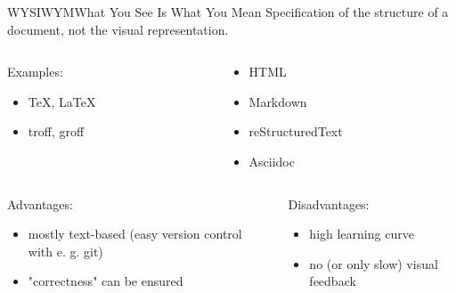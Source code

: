 \documentclass{setbeamer}
\begin{document}
\begin{frame}{WYSIWYM}{What You See Is What You Mean}
    Specification of the structure of a document, not the visual representation.

    \begin{columns}
        \begin{column}{0.5\textwidth}
            Examples:
            \begin{itemize}
                \item \TeX{}, \LaTeX{}
                \item troff, groff
            \end{itemize}
        \end{column}

        \begin{column}{0.5\textwidth}
            \begin{itemize}
                \item HTML
                \item Markdown
                \item reStructuredText
                \item Asciidoc
            \end{itemize}
        \end{column}
    \end{columns}

    \vspace{3mm}
    \begin{columns}
        \begin{column}{0.5\textwidth}
            Advantages:
            \begin{itemize}
                \item mostly text-based (easy version control with e. g. git)
                \item "correctness" can be ensured
            \end{itemize}
        \end{column}

        \begin{column}{0.5\textwidth}
            Disadvantages:
            \begin{itemize}
                \item high learning curve
                \item no (or only slow) visual feedback
            \end{itemize}
        \end{column}
    \end{columns}
\end{frame}
\end{document}

